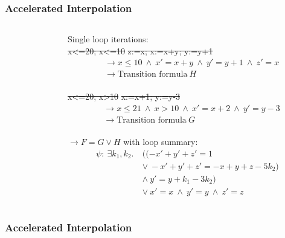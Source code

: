 \begin{frame}[t]
	\frametitle{Accelerated Interpolation}
	\begin{columns}
		\begin{column}{0.3\textwidth}
			\resizebox{0.8\textwidth}{!}{}
		\end{column}
		\begin{column}{0.55\textwidth}
			Single loop iterations: \vspace*{0.25cm}\\
			\st{x<=20; x<=10} \st{z:=x; x:=x+y; y:=y+1}
			\onslide<2->
			{\small 
			\begin{align*}
			&\rightarrow x \leq 10\ \land\ x' = x + y\ \land\ y' = y + 1\ \land\ z' = x \\
			&\rightarrow \text{Transition formula}\ H 
			\end{align*}
			}%
			\onslide<1-> \\
			\vspace*{1cm}\st{x<=20; x>10} \st{x:=x+1; y:=y-3}
			\onslide<2->
			\begin{align*}
			&\rightarrow	x \leq 21\ \land\ x > 10\ \land\ x' = x + 2\ \land\ y' = y -3 \\
			&\rightarrow \text{Transition formula}\ G
			\end{align*}
			\onslide<3-> \\
			\vspace*{0.5cm}
			$\rightarrow F = G \lor H$ \onslide<4-> with loop summary:
			\begin{align*}
				\psi: \	\exists k_1, k_2.\ &((-x' + y' + z' = 1\ \\ & \lor\ -x' + y' + z' = -x + y + z - 5k_2)\ \\ &\land\ y' = y + k_1 - 3k_2)\ \\ &\lor\ x' = x\ \land\ y' = y\ \land\ z' = z
			\end{align*}
		\end{column}
	\end{columns}
\end{frame}

\begin{frame}[t]
	\frametitle{Accelerated Interpolation}
	\begin{columns}
		\begin{column}{0.35\textwidth}
			\resizebox{0.8\textwidth}{!}{}
		\end{column}
		\begin{column}{0.55\textwidth}
			\resizebox{0.77\textwidth}{!}{}
		\end{column}
	\end{columns}
\end{frame}

